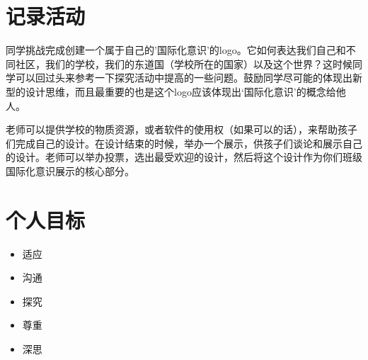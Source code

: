 \section{记录活动}
     同学挑战完成创建一个属于自己的'国际化意识'的logo。它如何表达我们自己和不同社区，我们的学校，我们的东道国（学校所在的国家）以及这个世界？这时候同学可以回过头来参考一下探究活动中提高的一些问题。鼓励同学尽可能的体现出新型的设计思维，而且最重要的也是这个logo应该体现出‘国际化意识’的概念给他人。\par
     老师可以提供学校的物质资源，或者软件的使用权（如果可以的话），来帮助孩子们完成自己的设计。在设计结束的时候，举办一个展示，供孩子们谈论和展示自己的设计。老师可以举办投票，选出最受欢迎的设计，然后将这个设计作为你们班级国际化意识展示的核心部分。

\section{个人目标}

   \begin{itemize}
     \item 适应
     \item 沟通
     \item 探究
     \item 尊重  
     \item 深思  
   \end{itemize}  





